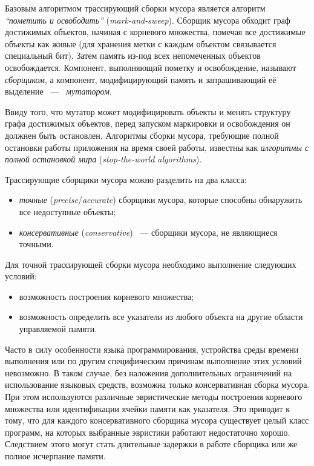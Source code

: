 Базовым алгоритмом трассирующий сборки мусора является алгоритм 
\emph{``пометить и освободить''} (\emph{mark-and-sweep}). 
Сборщик мусора обходит граф достижимых объектов, начиная с корневого множества, 
помечая все достижимые объекты как живые (для хранения метки с каждым объектом 
связывается специальный бит). 
Затем память из-под всех непомеченных объектов освобождается. 
Компонент, выполняющий пометку и освобождение, называют \emph{сборщиком}, 
а компонент, модифицирующий память и запрашивающий её выделение ~---~ \emph{мутатором}. 

Ввиду того, что мутатор может модифицировать объекты и менять структуру графа 
достижимых объектов, перед запуском маркировки и освобождения он должнен быть остановлен. 
Алгоритмы сборки мусора, требующие полной остановки работы приложения на время своей работы, 
известны как \emph{алгоритмы с полной остановкой мира} (\emph{stop-the-world algorithms}).

Трассирующие сборщики мусора можно разделить на два класса:
\begin{itemize}
\item 
	\emph{точные} (\emph{precise}/\emph{accurate}) сборщики мусора, 
	которые способны обнаружить все недоступные объекты;
\item 
	\emph{консервативные} (\emph{conservative}) ~--- сборщики мусора, 
	не являющиеся точными.
\end{itemize}

Для точной трассирующей сборки мусора необходимо выполнение следуюших условий:
\begin{itemize}
\item 
	возможность построения корневого множества;
\item 
	возможность определить все указатели из любого объекта на другие области 
	управляемой памяти.
\end{itemize}

Часто в силу особенности языка программирования, устройства среды времени выполнения 
или по другим специфическим причинам выполнение этих условий невозможно. 
В таком случае, без наложения дополнительных ограничений на использование языковых 
средств, возможна только консервативная сборка мусора. 
При этом используются различные эвристические методы построения корневого множества 
или идентификации ячейки памяти как указателя. 
Это приводит к тому, что для каждого консервативного сборщика мусора существует целый класс 
программ, на которых выбранные эвристики работают недостаточно хорошо\cite{boehm1993space}. 
Следствием этого могут стать длительные задержки в работе сборщика или же полное исчерпание 
памяти.


